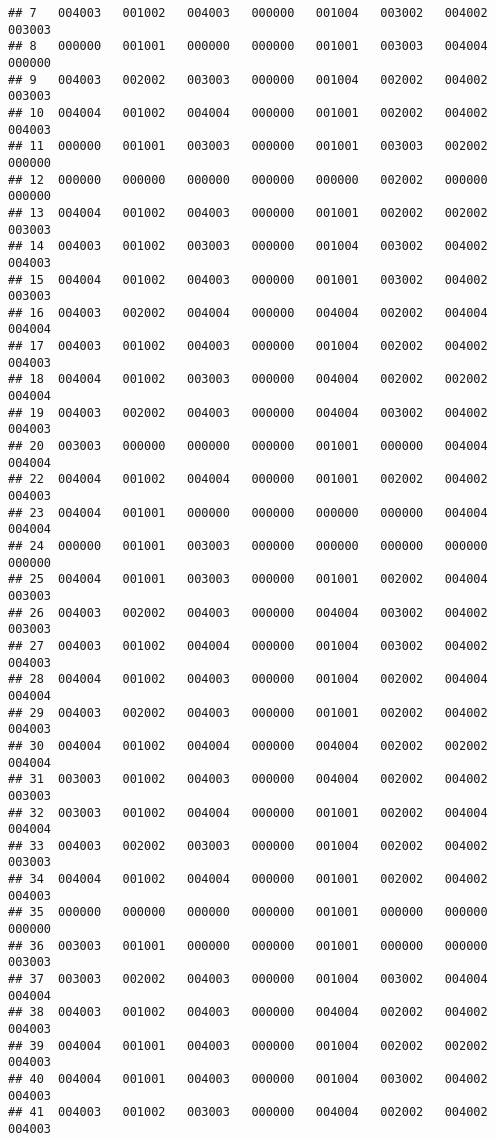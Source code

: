 \documentclass[
]{article}
\begin{document}
\begin{verbatim}
## 7   004003   001002   004003   000000   001004   003002   004002   003003
## 8   000000   001001   000000   000000   001001   003003   004004   000000
## 9   004003   002002   003003   000000   001004   002002   004002   003003
## 10  004004   001002   004004   000000   001001   002002   004002   004003
## 11  000000   001001   003003   000000   001001   003003   002002   000000
## 12  000000   000000   000000   000000   000000   002002   000000   000000
## 13  004004   001002   004003   000000   001001   002002   002002   003003
## 14  004003   001002   003003   000000   001004   003002   004002   004003
## 15  004004   001002   004003   000000   001001   003002   004002   003003
## 16  004003   002002   004004   000000   004004   002002   004004   004004
## 17  004003   001002   004003   000000   001004   002002   004002   004003
## 18  004004   001002   003003   000000   004004   002002   002002   004004
## 19  004003   002002   004003   000000   004004   003002   004002   004003
## 20  003003   000000   000000   000000   001001   000000   004004   004004
## 22  004004   001002   004004   000000   001001   002002   004002   004003
## 23  004004   001001   000000   000000   000000   000000   004004   004004
## 24  000000   001001   003003   000000   000000   000000   000000   000000
## 25  004004   001001   003003   000000   001001   002002   004004   003003
## 26  004003   002002   004003   000000   004004   003002   004002   003003
## 27  004003   001002   004004   000000   001004   003002   004002   004003
## 28  004004   001002   004003   000000   001004   002002   004004   004004
## 29  004003   002002   004003   000000   001001   002002   004002   004003
## 30  004004   001002   004004   000000   004004   002002   002002   004004
## 31  003003   001002   004003   000000   004004   002002   004002   003003
## 32  003003   001002   004004   000000   001001   002002   004004   004004
## 33  004003   002002   003003   000000   001004   002002   004002   003003
## 34  004004   001002   004004   000000   001001   002002   004002   004003
## 35  000000   000000   000000   000000   001001   000000   000000   000000
## 36  003003   001001   000000   000000   001001   000000   000000   003003
## 37  003003   002002   004003   000000   001004   003002   004004   004004
## 38  004003   001002   004003   000000   004004   002002   004002   004003
## 39  004004   001001   004003   000000   001004   002002   002002   004003
## 40  004004   001001   004003   000000   001004   003002   004002   004003
## 41  004003   001002   003003   000000   004004   002002   004002   004003

\end{verbatim}
\end{document}

